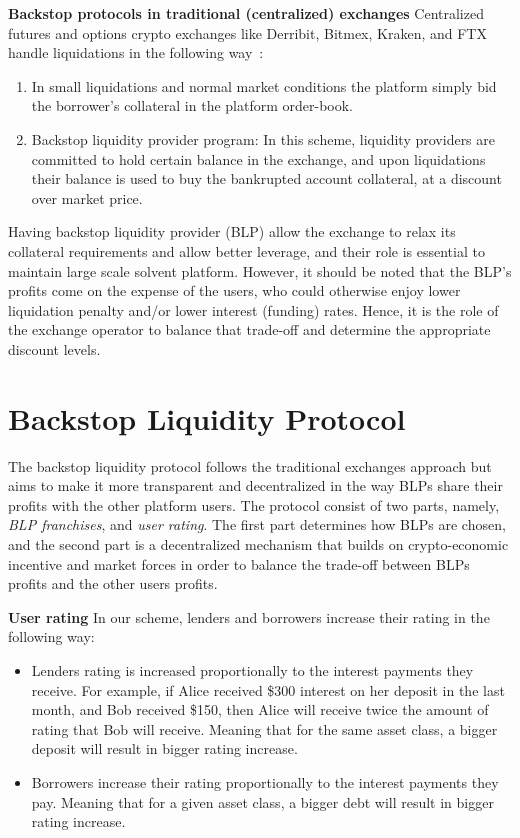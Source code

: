 \documentclass{article}
\begin{document}
\noindent\textbf{Backstop protocols in traditional (centralized) exchanges}
Centralized futures and options crypto exchanges like Derribit, Bitmex, Kraken, and FTX handle liquidations in the following way~\cite{ftx,kraken}:
\begin{enumerate}
    \item In small liquidations and normal market conditions the platform simply bid the borrower's collateral in the platform order-book.
    \item Backstop liquidity provider program: In this scheme, liquidity providers are committed to hold certain balance in the exchange, and upon liquidations their balance is used to buy the bankrupted account collateral, at a discount over market price.
\end{enumerate}
Having backstop liquidity provider (BLP) allow the exchange to relax its collateral requirements and allow better leverage, and their role is essential to maintain large scale solvent platform.
However, it should be noted that the BLP's profits come on the expense of the users, who could otherwise enjoy lower liquidation penalty and/or lower interest (funding) rates.
Hence, it is the role of the exchange operator to balance that trade-off and determine the appropriate discount levels. 

\section{Backstop Liquidity Protocol}\label{sec:FP}
The backstop liquidity protocol follows the traditional exchanges approach but aims to make it more transparent and decentralized in the way BLPs share their profits with the other platform users.
The protocol consist of two parts, namely, \emph{BLP franchises}, and \emph{user rating}.
The first part determines how BLPs are chosen, and the second part is a decentralized mechanism that builds on crypto-economic incentive and market forces in order to balance the trade-off between BLPs profits and the other users profits.

\noindent\textbf{User rating}
In our scheme, lenders and borrowers increase their rating in the following way:
\begin{itemize}
    \item Lenders rating is increased proportionally to the interest payments they receive. For example, if Alice received \$300 interest on her deposit in the last month, and Bob received \$150, then Alice will receive twice the amount of rating that Bob will receive. Meaning that for the same asset class, a bigger deposit will result in bigger rating increase. 
    \item Borrowers increase their rating proportionally to the interest payments they pay. Meaning that for a given asset class, a bigger debt will result in bigger rating increase.
\end{itemize}
\end{document}
